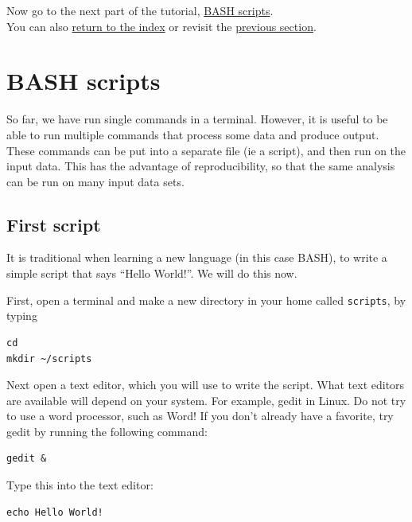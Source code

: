 \documentclass[11pt]{article}
\begin{document}
    Now go to the next part of the tutorial, \href{bash_scripts.ipynb}{BASH
scripts}.\\
You can also \href{index.ipynb}{return to the index} or revisit the
\href{grep.ipynb}{previous section}.





\newpage






    \hypertarget{bash-scripts}{%
\section{BASH scripts}\label{bash-scripts}}

So far, we have run single commands in a terminal. However, it is useful
to be able to run multiple commands that process some data and produce
output. These commands can be put into a separate file (ie a script),
and then run on the input data. This has the advantage of
reproducibility, so that the same analysis can be run on many input data
sets.

\hypertarget{first-script}{%
\subsection{First script}\label{first-script}}

It is traditional when learning a new language (in this case BASH), to
write a simple script that says ``Hello World!''. We will do this now.

First, open a terminal and make a new directory in your home called
\texttt{scripts}, by typing

\begin{verbatim}
cd
mkdir ~/scripts
\end{verbatim}

Next open a text editor, which you will use to write the script. What
text editors are available will depend on your system. For example,
gedit in Linux. Do not try to use a word processor, such as Word! If you
don't already have a favorite, try gedit by running the following
command:

\begin{verbatim}
gedit &
\end{verbatim}

Type this into the text editor:

\begin{verbatim}
echo Hello World!
\end{verbatim}
\end{document}
